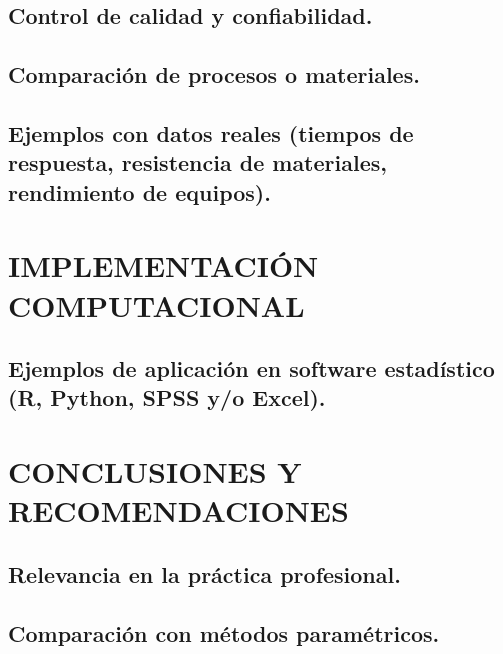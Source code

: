 \documentclass[
  oneside]{book}
\begin{document}
\subsection{Control de calidad y confiabilidad.}\label{control-de-calidad-y-confiabilidad.}

\subsection{Comparación de procesos o materiales.}\label{comparaciuxf3n-de-procesos-o-materiales.}

\subsection{Ejemplos con datos reales (tiempos de respuesta, resistencia de materiales, rendimiento de equipos).}\label{ejemplos-con-datos-reales-tiempos-de-respuesta-resistencia-de-materiales-rendimiento-de-equipos.}

\section{IMPLEMENTACIÓN COMPUTACIONAL}\label{implementaciuxf3n-computacional}

\subsection{Ejemplos de aplicación en software estadístico (R, Python, SPSS y/o Excel).}\label{ejemplos-de-aplicaciuxf3n-en-software-estaduxedstico-r-python-spss-yo-excel.}

\section{CONCLUSIONES Y RECOMENDACIONES}\label{conclusiones-y-recomendaciones}

\subsection{Relevancia en la práctica profesional.}\label{relevancia-en-la-pruxe1ctica-profesional.}

\subsection{Comparación con métodos paramétricos.}\label{comparaciuxf3n-con-muxe9todos-paramuxe9tricos.}
\end{document}
